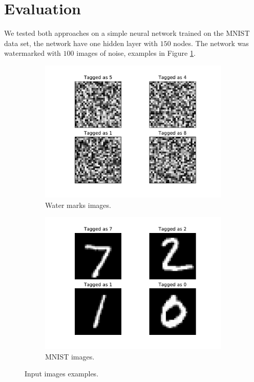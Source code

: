 \documentclass{easychair}
\begin{document}
\section{Evaluation}
\label{sec:evaluation}

We tested both approaches on a simple neural network trained on the MNIST data set, the network have one hidden layer with $150$ nodes. The network was watermarked with $100$ images of noise, examples in Figure \ref{fig:noiseExample}.

\begin{figure}
  \centering
  \begin{subfigure}{0.4\linewidth}
    \includegraphics[width=\linewidth]{../data/wm.pdf}
     \caption{Water marks images.}
  \label{fig:noiseExample}
  \end{subfigure}
  \begin{subfigure}{0.4\linewidth}
    \includegraphics[width=\linewidth]{../data/mnist.pdf}
    \caption{MNIST images.}
  \label{fig:mnistExample}
  \end{subfigure}
\caption{Input images examples.}
\label{fig:inputExample}
\end{figure}
\end{document}
